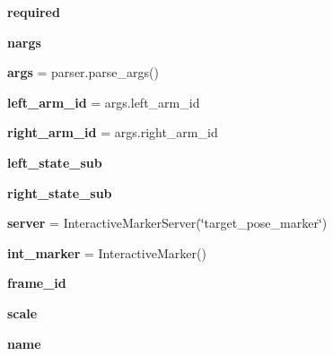 \begin{DoxyCompactItemize}
{\bfseries required}
\item 
\mbox{\label{namespacedual__arm__interactive__marker_a870908ca0a91fc8808dfe9e398e0f8b6}} 
{\bfseries nargs}
\item 
\mbox{\label{namespacedual__arm__interactive__marker_a6e82d86ff9b8fe95975de7900f8e2aa3}} 
{\bfseries args} = parser.\+parse\+\_\+args()
\item 
\mbox{\label{namespacedual__arm__interactive__marker_ace8a93e369537d92f17b9861d31cb885}} 
{\bfseries left\+\_\+arm\+\_\+id} = args.\+left\+\_\+arm\+\_\+id
\item 
\mbox{\label{namespacedual__arm__interactive__marker_a80a58bbac980f1ea20a26676176c5413}} 
{\bfseries right\+\_\+arm\+\_\+id} = args.\+right\+\_\+arm\+\_\+id
\item 
{\bfseries left\+\_\+state\+\_\+sub}
\item 
{\bfseries right\+\_\+state\+\_\+sub}
\item 
\mbox{\label{namespacedual__arm__interactive__marker_a5eaefed5ff5ae605348f4193b53733a9}} 
{\bfseries server} = Interactive\+Marker\+Server(\char`\"{}target\+\_\+pose\+\_\+marker\char`\"{})
\item 
\mbox{\label{namespacedual__arm__interactive__marker_a2eebfc53764d8ec847c6f9e58b4a3558}} 
{\bfseries int\+\_\+marker} = Interactive\+Marker()
\item 
\mbox{\label{namespacedual__arm__interactive__marker_aaa5e3e8f0a8e125d0f02f2d971d0694a}} 
{\bfseries frame\+\_\+id}
\item 
\mbox{\label{namespacedual__arm__interactive__marker_aeb3429c5c8fc1b6838571accb54813bb}} 
{\bfseries scale}
\item 
\mbox{\label{namespacedual__arm__interactive__marker_a784e31cc90b2e3c4eca59faf857bbc06}} 
{\bfseries name}

\end{DoxyCompactItemize}
